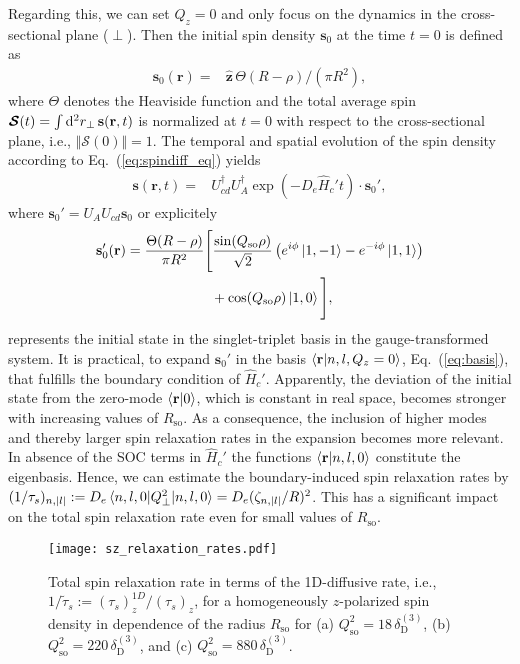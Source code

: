 \documentclass[superscriptaddress,noshowpacs,noshowkeys, twocolumn, floatfix,aps, prb,reprint]{revtex4-1}
\begin{document}
Regarding this, we can set $Q_z=0$ and only focus on the dynamics in the cross-sectional plane ($\perp$).
Then the initial spin density $\mathbf{s}_0$ at the time $t=0$ is defined as
%
\begin{align}
\mathbf{s}_0(\mathbf{r})={}&\mathbf{\hat{z}} \,\Theta (R-\rho)/(\pi R^2),
\label{eq:init_cond}
\end{align}
%
where $\Theta$ denotes the Heaviside function and the total average spin $\boldsymbol{\mathcal{S}}(t)=\int {\rm d}^2r_\perp\,\mathbf{s}(\mathbf{r},t)$ is normalized at $t=0$ with respect to the cross-sectional plane, i.e., $\Vert\boldsymbol{\mathcal{S}}(0)\Vert=1$. %
The temporal and spatial evolution of the spin density according to Eq.~(\ref{eq:spindiff_eq}) yields
%
\begin{align}
\mathbf{s}(\mathbf{r},t)={}&U_{cd}^\dag U_{A}^\dag \exp(-D_e \hat{H}_c' t)\cdot \mathbf{s}_0', 
\end{align}
%
where $\mathbf{s}_0'=U_{A} U_{cd} \mathbf{s}_0$ or explicitely 
%
\begin{align}
\mathbf{s}_0'(\mathbf{r})={}&\frac{\Theta (R-\rho)}{\pi R^2}\Bigg[\frac{\sin(Q_\text{so}\rho)}{\sqrt{2}}\left(e^{i \phi}\ket{1,-1}-e^{-i \phi}\ket{1,1}\right)\notag\\
&\phantom{\frac{\Theta (R-\rho)}{\pi R^2}\Big[}+\cos(Q_\text{so}\rho)\ket{1,0}\Bigg],
\end{align}
%
represents the initial state in the singlet-triplet basis in the gauge-transformed system.
It is practical, to expand $\mathbf{s}_0'$ in the basis $\braket{\mathbf{r}|n,l,Q_z=0}$, Eq.~(\ref{eq:basis}), that fulfills the boundary condition of $\hat{H}_c'$.
Apparently, the deviation of the initial state from the zero-mode $\braket{\mathbf{r}|0}$, which is constant in real space, becomes stronger with increasing values of $R_\text{so}$.
As a consequence, the inclusion of higher modes and thereby larger spin relaxation rates in the expansion becomes more relevant.
In absence of the SOC terms in  $\hat{H}_c'$ the functions $\braket{\mathbf{r}|n,l,0}$ constitute the eigenbasis.
Hence, we can estimate the boundary-induced spin relaxation rates by $(1/\tau_s)_{n,\vert l \vert}:=D_e\braket{n,l,0|Q_\perp^2|n,l,0}=D_e(\zeta_{n,\vert l \vert}/R)^2$. 
This has a significant impact on the total spin relaxation rate even for small values of $R_\text{so}$.

\begin{figure}[t]
\texttt{[image: sz\_relaxation\_rates.pdf]}
\caption{Total spin relaxation rate   in terms of the 1D-diffusive rate, i.e.,  $1/\tilde{\tau}_s:=(\tau_s)^{1D}_z/(\tau_s)_z$, for a homogeneously $z$-polarized spin density in dependence of the radius $R_\text{so}$ for (a) $Q_\text{so}^2 =18 \,\delta_\text{D}^{(3)}$, (b) $Q_\text{so}^2 =220\,\delta_\text{D}^{(3)}$, and (c) $Q_\text{so}^2 =880\,\delta_\text{D}^{(3)}$.}
\label{fig:sz_rates}
\end{figure}
\end{document}
